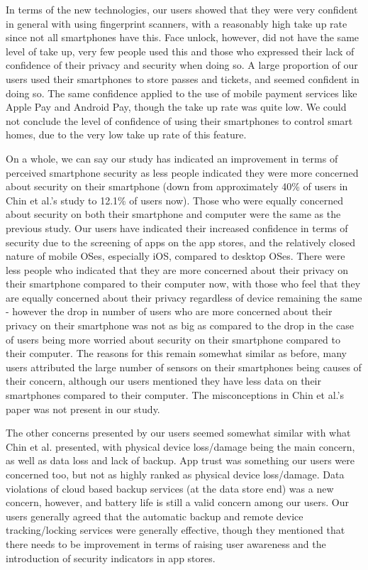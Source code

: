 \documentclass{sigchi}
\begin{document}
In terms of the new technologies, our users showed that they were very confident in general with using fingerprint scanners, with a reasonably high take up rate since not all smartphones have this. Face unlock, however, did not have the same level of take up, very few people used this and those who expressed their lack of confidence of their privacy and security when doing so. A large proportion of our users used their smartphones to store passes and tickets, and seemed confident in doing so. The same confidence applied to the use of mobile payment services like Apple Pay and Android Pay, though the take up rate was quite low. We could not conclude the level of confidence of using their smartphones to control smart homes, due to the very low take up rate of this feature.

On a whole, we can say our study has indicated an improvement in terms of perceived smartphone security as less people indicated they were more concerned about security on their smartphone  (down from approximately 40\% of users in Chin et al.'s study to 12.1\% of users now). Those who were equally concerned about security on both their smartphone and computer were the same as the previous study.  Our users have indicated their increased confidence in terms of security due to the screening of apps on the app stores, and the relatively closed nature of mobile OSes, especially iOS, compared to desktop OSes. There were less people who indicated that they are more concerned about their privacy on their smartphone compared to their computer now, with those who feel that they are equally concerned about their privacy regardless of device remaining the same - however the drop in number of users who are more concerned about their privacy on their smartphone was not as big as compared to the drop in the case of users being more worried about security on their smartphone compared to their computer. The reasons for this remain somewhat similar as before, many users attributed the large number of sensors on their smartphones being causes of their concern, although our users mentioned they have less data on their smartphones compared to their computer. The misconceptions in Chin et al.'s paper was not present in our study.

The other concerns presented by our users seemed somewhat similar with what Chin et al. presented, with physical device loss/damage being the main concern, as well as data loss and lack of backup. App trust was something our users were concerned too, but not as highly ranked as physical device loss/damage. Data violations of cloud based backup services (at the data store end) was a new concern, however, and battery life is still a valid concern among our users. Our users generally agreed that the automatic backup and remote device tracking/locking services were generally effective, though they mentioned that there needs to be improvement in terms of raising user awareness and the introduction of security indicators in app stores.
\end{document}
